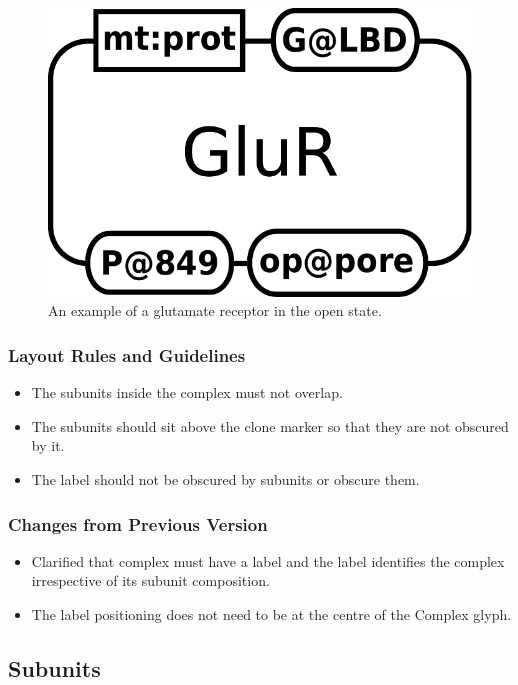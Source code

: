 \begin{figure}[H]
  \centering
  \includegraphics[scale = 0.3]{examples/macromolecule-GluR}
  \caption{An example of a glutamate receptor in the open state.}
  \label{fig:example-glur}
\end{figure}


\subsubsection{Layout Rules and Guidelines}

\begin{itemize}
\item The subunits inside the complex must not overlap.
\item The subunits should sit above the clone marker so that they are
  not obscured by it.
\item The label should not be obscured by subunits or obscure them.
\end{itemize}


\subsubsection{Changes from Previous Version}

\begin{itemize}
\item Clarified that complex must have a label and the label
  identifies the complex irrespective of its subunit composition.
\item The label positioning does not need to be at the centre of the
  Complex glyph.
\end{itemize}

\subsection{Subunits}

